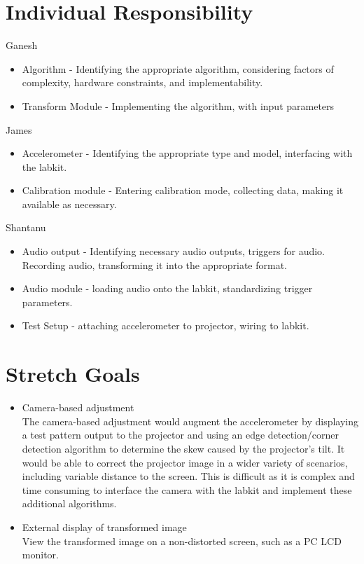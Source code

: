 \documentclass{article}
\begin{document}
\section{Individual Responsibility}
\begin{description}
	\item{Ganesh}
	\begin{itemize}
		\item Algorithm - Identifying the appropriate algorithm, considering factors of complexity, hardware constraints, and implementability. 
		\item Transform Module - Implementing the algorithm, with input parameters
	\end{itemize}
	\item{James}
	\begin{itemize}
		\item Accelerometer - Identifying the appropriate type and model, interfacing with the labkit.
		\item Calibration module - Entering calibration mode, collecting data, making it available as necessary. 
	\end{itemize}
	\item{Shantanu}
	\begin{itemize}
		\item Audio output - Identifying necessary audio outputs, triggers for audio. Recording audio, transforming it into the appropriate format. 
		\item Audio module - loading audio onto the labkit, standardizing trigger parameters. 
		\item Test Setup - attaching accelerometer to projector, wiring to labkit. 
	\end{itemize}
\end{description}

\section{Stretch Goals}
	\begin{itemize}
		\item Camera-based adjustment \hfill \\
			The camera-based adjustment would augment the accelerometer by displaying a test pattern output to the projector and using an edge detection/corner detection algorithm to determine the skew caused by the projector's tilt. It would be able to correct the projector image in a wider variety of scenarios, including variable distance to the screen. This is difficult as it is complex and time consuming to interface the camera with the labkit and implement these additional algorithms. 
		\item External display of transformed image\hfill \\
			View the transformed image on a non-distorted screen, such as a PC LCD monitor. 
	\end{itemize}
\end{document}
